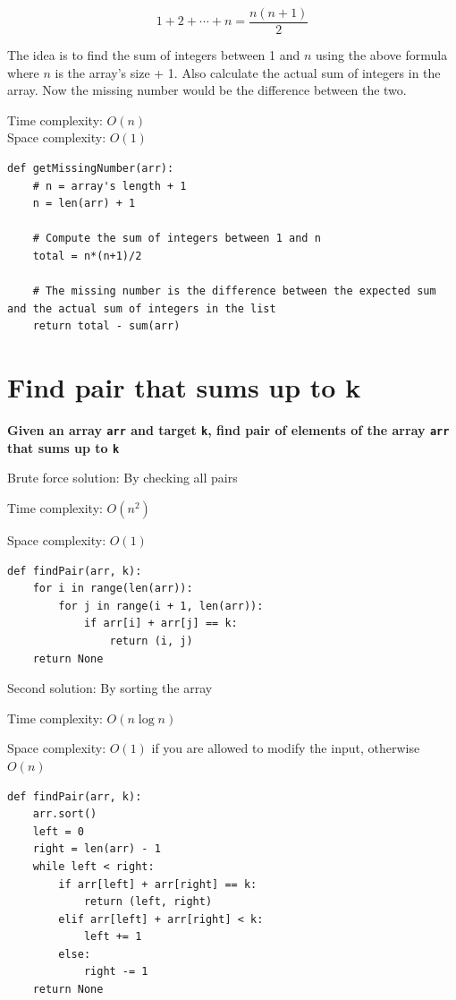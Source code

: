 \documentclass[a4paper,11pt]{book}
\begin{document}
$$1 + 2 + \cdots + n = \dfrac{n(n+1)}{2}$$

\noindent The idea is to find the sum of integers between 1 and $n$ using the above formula where $n$ is the array's size + 1. Also calculate the actual sum of integers in the array. Now the missing number would be the difference between the two.

\noindent Time complexity:  $O(n)$\\
\noindent Space complexity: $O(1)$

\begin{lstlisting}
def getMissingNumber(arr):
    # n = array's length + 1
    n = len(arr) + 1
 
    # Compute the sum of integers between 1 and n
    total = n*(n+1)/2
 
    # The missing number is the difference between the expected sum and the actual sum of integers in the list
    return total - sum(arr)
\end{lstlisting}




\newpage
\section{Find pair that sums up to k}

\textbf{Given an array \lstinline{arr} and target \lstinline{k}, find pair of elements of the array \lstinline{arr} that sums up to \lstinline{k}}
\vspace{5mm}

\noindent Brute force solution: By checking all pairs

\noindent Time complexity:  $O(n^2)$

\noindent Space complexity: $O(1)$

\begin{lstlisting}
def findPair(arr, k):
    for i in range(len(arr)):
        for j in range(i + 1, len(arr)):
            if arr[i] + arr[j] == k:
                return (i, j)
    return None
\end{lstlisting}

\noindent Second solution: By sorting the array

\noindent Time complexity: $O(n\log n)$

\noindent Space complexity: $O(1)$ if you are allowed to modify the input, otherwise $O(n)$

\begin{lstlisting}
def findPair(arr, k):
    arr.sort()
    left = 0
    right = len(arr) - 1
    while left < right:
        if arr[left] + arr[right] == k:
            return (left, right)
        elif arr[left] + arr[right] < k:
            left += 1
        else:
            right -= 1
    return None
\end{lstlisting}
\end{document}
